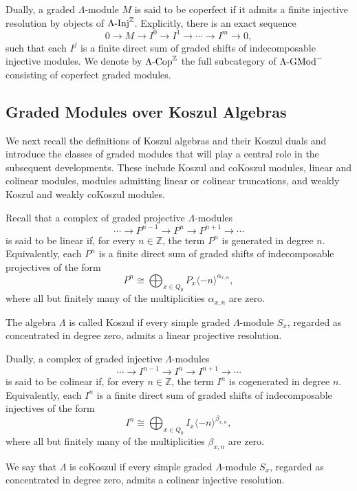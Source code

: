 \documentclass[11pt]{article}
\theoremstyle{definition}
\theoremstyle{remark}
\begin{document}
Dually, a graded \(\Lambda\)-module \(M\) is said to be coperfect if it admits
a finite injective resolution by objects of \(\Lambda\textup{-Inj}^{\mathbb Z}\).
Explicitly, there is an exact sequence
\[
0\longrightarrow M
\longrightarrow I^0
\longrightarrow I^1
\longrightarrow\cdots
\longrightarrow I^{m}
\longrightarrow 0,
\]
such that each \(I^j\) is a finite direct sum of graded shifts of
indecomposable injective modules. We denote by
\(\Lambda\textup{-Cop}^{\mathbb Z}\) the full subcategory of
\(\Lambda\textup{-GMod}^{-}\) consisting of coperfect graded modules.
\subsection{Graded Modules over Koszul Algebras}
We next recall the definitions of Koszul algebras and their Koszul duals and introduce the classes of graded modules that will play a central role in the subsequent developments. These include Koszul and coKoszul modules, linear and colinear modules, modules admitting linear or colinear truncations, and weakly Koszul and weakly coKoszul modules.
\medskip

Recall that a complex of graded projective \(\Lambda\)-modules
\[
\cdots \longrightarrow P^{n-1}
\longrightarrow P^{n}
\longrightarrow P^{n+1}
\longrightarrow \cdots
\]
is said to be linear if, for every \(n\in\mathbb{Z}\), the term \(P^{n}\) is
generated in degree \(n\). Equivalently, each \(P^{n}\) is a finite direct sum of
graded shifts of indecomposable projectives of the form
\[
P^{n}\cong
\bigoplus_{x\in Q_{0}} P_x\langle -n\rangle^{\alpha_{x,n}},
\]
where all but finitely many of the multiplicities \(\alpha_{x,n}\) are zero.

The algebra \(\Lambda\) is called Koszul if every simple graded
\(\Lambda\)-module \(S_x\), regarded as concentrated in degree zero, admits a
linear projective resolution.

Dually, a complex of graded injective \(\Lambda\)-modules
\[
\cdots \longrightarrow I^{n-1}
\longrightarrow I^{n}
\longrightarrow I^{n+1}
\longrightarrow \cdots
\]
is said to be colinear if, for every \(n\in\mathbb{Z}\), the term \(I^{n}\) is
cogenerated in degree \(n\). Equivalently, each \(I^{n}\) is a finite direct sum
of graded shifts of indecomposable injectives of the form
\[
I^{n}\cong
\bigoplus_{x\in Q_{0}} I_x\langle -n\rangle^{\beta_{x,n}},
\]
where all but finitely many of the multiplicities \(\beta_{x,n}\) are zero.

We say that \(\Lambda\) is coKoszul if every simple graded
\(\Lambda\)-module \(S_x\), regarded as concentrated in degree zero, admits a
colinear injective resolution.
\end{document}
